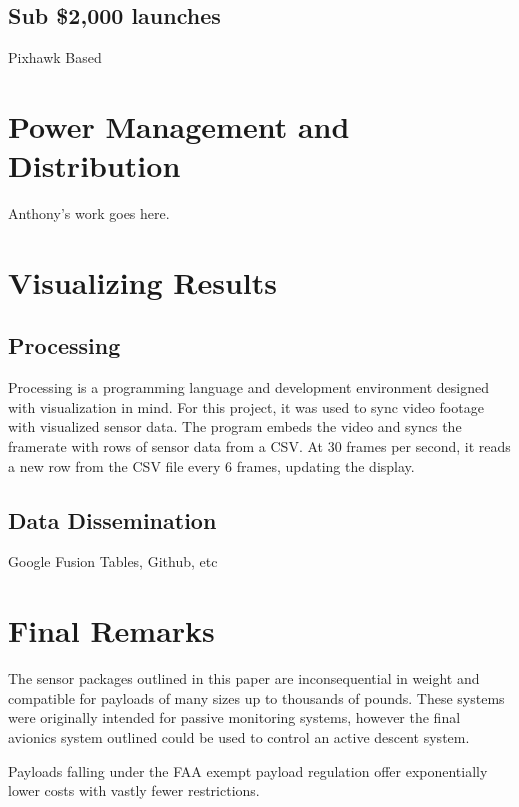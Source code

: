 \documentclass[heading.tex]{subfiles}
\begin{document}
\subsection{Sub \$2,000 launches}

Pixhawk Based

\section{Power Management and Distribution}

Anthony's work goes here.

\section{Visualizing Results}

\subsection{Processing}

Processing is a programming language and development environment designed
with visualization in mind. For this project, it was used to sync video
footage with visualized sensor data. The program embeds the video and syncs
the framerate with rows of sensor data from a CSV. At 30 frames per second,
it reads a new row from the CSV file every 6 frames, updating the display.

\subsection{Data Dissemination}

Google Fusion Tables, Github, etc

\section{Final Remarks}
The sensor packages outlined in this paper are inconsequential in weight and
compatible for payloads of many sizes up to thousands of pounds.
These systems were originally intended for passive monitoring systems, however the final avionics system outlined could be used to control an active descent system.

Payloads falling under the FAA exempt payload regulation offer exponentially
lower costs with vastly fewer restrictions. 
\end{document}

